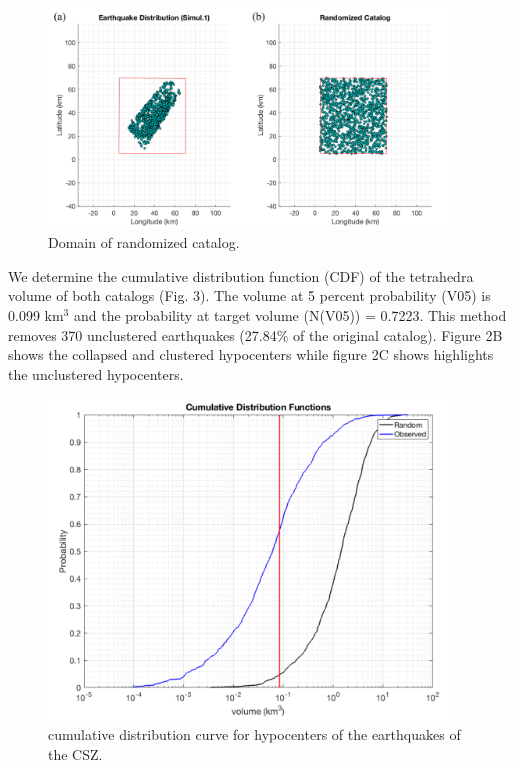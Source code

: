 \documentclass[draft]{agujournal2018}
\begin{document}
\begin{figure}[ht]
\centering
\includegraphics[width=25pc]{Figures/domain_cum_only.png}
\caption{Domain of randomized catalog.}
\label{figfive}
\end{figure}

We determine the cumulative distribution function (CDF) of the tetrahedra volume of both catalogs (Fig. 3). The volume at 5 percent probability (V05) is 0.099 km$^{3}$ and the probability at target volume (N(V05)) = 0.7223. This method removes 370 unclustered earthquakes (27.84\% of the original catalog). Figure 2B shows the collapsed and clustered hypocenters while figure 2C shows highlights the unclustered hypocenters. 

\begin{figure}[ht]
\centering
\includegraphics[width=25pc]{Figures/cdf_cum_only.png}
\caption{cumulative distribution curve for hypocenters of the earthquakes of the CSZ.}
\label{figfive}
\end{figure}
\end{document}

